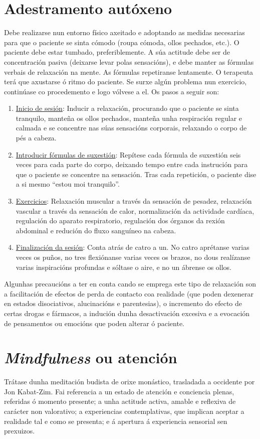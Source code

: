 \documentclass[a4paper,11pt]{article}
\begin{document}
\section{Adestramento autóxeno}
Debe realizarse nun entorno físico axeitado e adoptando as medidas necesarias para que o paciente se sinta cómodo (roupa cómoda, ollos pechados, etc.). O paciente debe estar tumbado, preferiblemente. A súa actitude debe ser de concentración pasiva (deixarse levar polas sensacións), e debe manter as fórmulas verbais de relaxación na mente. As fórmulas repetiranse lentamente. O terapeuta terá que axustarse ó ritmo do paciente. Se surxe algún problema nun exercicio, continúase co procedemento e logo vólvese a el. Os pasos a seguir son:
\begin{enumerate}
	\item  \underline{Inicio de sesión}: Inducir a relaxación, procurando que o paciente se sinta 
	tranquilo, manteña os ollos pechados, manteña unha respiración regular e calmada e se concentre 
	nas súas sensacións corporais, relaxando o corpo de pés a cabeza.
	\item \underline{Introducir fórmulas de suxestión}: Repítese cada fórmula de suxestión seis veces 
	para cada parte do corpo, deixando tempo entre cada instrución para que o paciente se concentre 
	na sensación. Tras cada repetición, o paciente dise a si mesmo ``estou moi tranquilo''. 
	\item \underline{Exercicios}: Relaxación muscular a través da sensación de pesadez, relaxación 
	vascular a través da sensación de calor, normalización da actividade cardíaca, regulación do 
	aparato respiratorio, regulación dos órganos da rexión abdominal e redución do fluxo sanguíneo na 
	cabeza. 
	\item \underline{Finalización da sesión}: Conta atrás de catro a un. No catro aprétanse varias 
	veces os puños, no tres flexiónanse varias veces os brazos, no dous realízanse varias 
	inspiracións profundas e sóltase o aire, e no un ábrense os ollos. 
\end{enumerate}

Algunhas precaucións a ter en conta cando se emprega este tipo de relaxación son a facilitación de efectos de perda de contacto coa realidade (que poden dexenerar en estados disociativos, alucinacións e parentesias), o incremento do efecto de certas drogas e fármacos, a indución dunha desactivación excesiva e a evocación de pensamentos ou emocións que poden alterar ó paciente. 

\section{\textit{Mindfulness} ou atención}
Trátase dunha meditación budista de orixe monástico, trasladada a occidente por Jon Kabat-Zim. Fai referencia a un estado de atención e conciencia plenas, referidas ó momento presente; a unha actitude activa, amable e reflexiva de carácter non valorativo; a experiencias contemplativas, que implican aceptar a realidade tal e como se presenta; e á apertura á experiencia sensorial sen prexuizos. 
\end{document}

